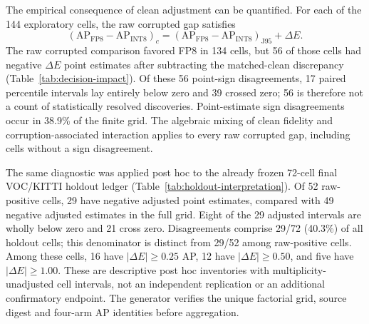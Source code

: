 \documentclass[10pt]{article}
\newcommand{\AP}{\mathrm{AP}}
\newcommand{\Jclean}{\mathrm{J95}}
\newcommand{\DeltaE}{\Delta E}
\begin{document}
The empirical consequence of clean adjustment can be quantified. For each
of the 144 exploratory cells, the raw corrupted gap satisfies
\begin{equation}
(\AP_{\mathrm{FP8}}-\AP_{\mathrm{INT8}})_{c}
=(\AP_{\mathrm{FP8}}-\AP_{\mathrm{INT8}})_{\Jclean}+\DeltaE.
\end{equation}
The raw corrupted comparison favored FP8 in 134 cells, but 56 of those cells
had negative $\DeltaE$ point estimates after subtracting the matched-clean
discrepancy (Table~\ref{tab:decision-impact}). Of these 56 point-sign
disagreements, 17 paired percentile intervals lay entirely below zero and 39 crossed
zero; 56 is therefore not a count of statistically resolved discoveries.
Point-estimate sign disagreements occur in 38.9\% of the finite grid. The algebraic
mixing of clean fidelity and corruption-associated interaction applies to
every raw corrupted gap, including cells without a sign disagreement.

\begin{table}[htbp]
\centering
\caption{Point-sign inventory over the 144 exploratory cells. ``Below AP''
counts a cell when at least one quantized treatment falls below the descriptive cutoff.}
\label{tab:decision-impact}
\small

\end{table}

The same diagnostic was applied post hoc to the already frozen 72-cell final
VOC/KITTI holdout ledger (Table~\ref{tab:holdout-interpretation}). Of 52 raw-positive
cells, 29 have negative adjusted point estimates, compared with 49 negative
adjusted estimates in the full grid. Eight of the 29 adjusted intervals are
wholly below zero and 21 cross zero. Disagreements comprise 29/72 (40.3\%) of all
holdout cells; this denominator is distinct from 29/52 among raw-positive cells.
Among these cells, 16 have $|\Delta E|\geq0.25$ AP, 12 have $|\Delta E|\geq0.50$,
and five have $|\Delta E|\geq1.00$. These are descriptive post hoc inventories
with multiplicity-unadjusted cell intervals, not an independent replication or
an additional confirmatory endpoint. The generator verifies the unique
factorial grid, source digest and four-arm AP identities before aggregation.

\begin{table}[htbp]
\centering\small
\caption{Post hoc holdout point-sign diagnostic. A disagreement requires $G_c>0$
and $\Delta E<0$. The last two columns concern only those cells and use
multiplicity-unadjusted paired percentile intervals.}
\label{tab:holdout-interpretation}

\end{table}
\end{document}
